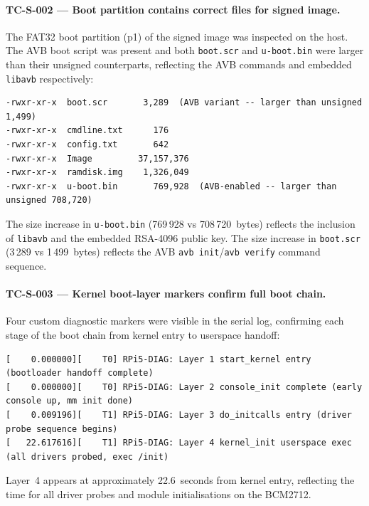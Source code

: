 \paragraph{TC-S-002 --- Boot partition contains correct files for signed image.}
The FAT32 boot partition (p1) of the signed image was inspected on the host.  The AVB boot script was present and both \texttt{boot.scr} and \texttt{u-boot.bin} were larger than their unsigned counterparts, reflecting the AVB commands and embedded \texttt{libavb} respectively:

\begin{lstlisting}[caption={TC-S-002: Boot partition file listing --- signed image}]
-rwxr-xr-x  boot.scr       3,289  (AVB variant -- larger than unsigned 1,499)
-rwxr-xr-x  cmdline.txt      176
-rwxr-xr-x  config.txt       642
-rwxr-xr-x  Image         37,157,376
-rwxr-xr-x  ramdisk.img    1,326,049
-rwxr-xr-x  u-boot.bin       769,928  (AVB-enabled -- larger than unsigned 708,720)
\end{lstlisting}

The size increase in \texttt{u-boot.bin} (769\,928 vs 708\,720~bytes) reflects the inclusion of \texttt{libavb} and the embedded RSA-4096 public key.  The size increase in \texttt{boot.scr} (3\,289 vs 1\,499~bytes) reflects the AVB \texttt{avb init}/\texttt{avb verify} command sequence.

\paragraph{TC-S-003 --- Kernel boot-layer markers confirm full boot chain.}
Four custom diagnostic markers were visible in the serial log, confirming each stage of the boot chain from kernel entry to userspace handoff:

\begin{lstlisting}[caption={TC-S-003: Kernel RPi5-DIAG boot-layer markers (abbreviated)}]
[    0.000000][    T0] RPi5-DIAG: Layer 1 start_kernel entry (bootloader handoff complete)
[    0.000000][    T0] RPi5-DIAG: Layer 2 console_init complete (early console up, mm init done)
[    0.009196][    T1] RPi5-DIAG: Layer 3 do_initcalls entry (driver probe sequence begins)
[   22.617616][    T1] RPi5-DIAG: Layer 4 kernel_init userspace exec (all drivers probed, exec /init)
\end{lstlisting}

Layer~4 appears at approximately 22.6~seconds from kernel entry, reflecting the time for all driver probes and module initialisations on the BCM2712.


